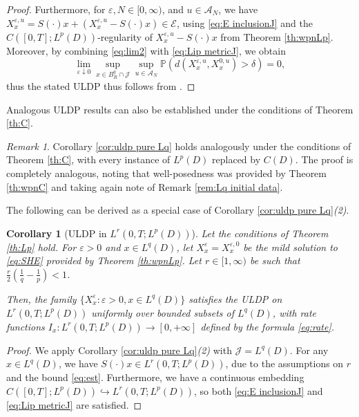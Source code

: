 \documentclass{amsart}
\theoremstyle{plain}
\theoremstyle{remark}
\newtheorem{remark}[theorem]{Remark}
\theoremstyle{plain}
\newtheorem{corollary}[theorem]{Corollary}
\numberwithin{equation}{section}
\newcommand{\col}{\colon}
\renewcommand{\P}{{\mathbb P}}
\newcommand{\eps}{\varepsilon}
\newcommand{\A}{{\mathcal A}}
\newcommand{\into}{\hookrightarrow}
\begin{document}
\begin{proof}
Furthermore, for $\eps,N\in[0,\infty)$, and $u\in \A_N$, we have  $X_x^{\eps,u}=S(\cdot)x+(X_x^{\eps,u}-S(\cdot)x)\in \mathcal{E}$, using \eqref{eq:E inclusionJ} and the $C([0,T];L^p(D))$-regularity of $X_x^{\eps,u}-S(\cdot)x$ from  Theorem \ref{th:wpnLp}. Moreover, by combining \eqref{eq:lim2} with \eqref{eq:Lip metricJ}, we obtain
\[
\lim_{\eps\downarrow 0}\sup_{x\in B_R^q\cap\mathcal{J}}\sup_{u\in\A_N}\P(d(X_x^{\eps,u},X_x^{0,u})>\delta)=0, \]
thus the stated ULDP thus follows from \cite[Th.\ 3.12]{Salins19equivalences}. 
\end{proof}

Analogous ULDP results can also be established under the conditions of Theorem \ref{th:C}.  

\begin{remark}\label{rem:more uldps}
Corollary \ref{cor:uldp pure Lq} holds analogously   under the conditions of Theorem \ref{th:C}, with every instance of $L^p(D)$ replaced by $C(D)$. The proof is completely analogous, noting that well-posedness was provided by Theorem \ref{th:wpnC} and  taking again note of Remark \ref{rem:Lq initial data}. 
\end{remark}

The following can be derived as a special case of Corollary \ref{cor:uldp pure Lq}\textit{(2)}.

\begin{corollary}[ULDP  in $L^r(0,T;L^p(D))$]\label{cor:uldp LrLp}  
Let the conditions of Theorem \ref{th:Lp} hold. For $\eps>0$ and $x\in L^q(D)$, let $X_x^{\eps}=X_x^{\eps,0}$ be the mild solution to \eqref{eq:SHE} provided by Theorem \ref{th:wpnLp}.  Let $r \in [1,\infty)$ be such that  $\frac{r}{2}(\frac1q-\frac{1}{p})<1$. 

Then, the family  $\{X_x^{\eps} :\eps>0,x\in L^q(D)\}$  satisfies the ULDP on $L^r(0,T;L^{p}(D))$  uniformly over bounded subsets of $L^q(D)$, with rate functions $I_x\col L^r(0,T;L^{p}(D))\to [0,+\infty]$ defined by the formula \eqref{eq:rate}. 
\end{corollary}
\begin{proof}
We apply Corollary \ref{cor:uldp pure Lq}\textit{(2)} with $\mathcal{J}=L^q(D)$. 
    For any $x\in L^q(D)$, we have  $S(\cdot)x\in L^r(0,T;L^{p}(D))$, due to the assumptions on $r$ and the bound \eqref{eq:est}. Furthermore, we have a continuous embedding $C([0,T];L^p(D))\into L^r(0,T;L^{p}(D))$, so both \eqref{eq:E inclusionJ} and \eqref{eq:Lip metricJ} are satisfied. 
\end{proof}
\end{document}
